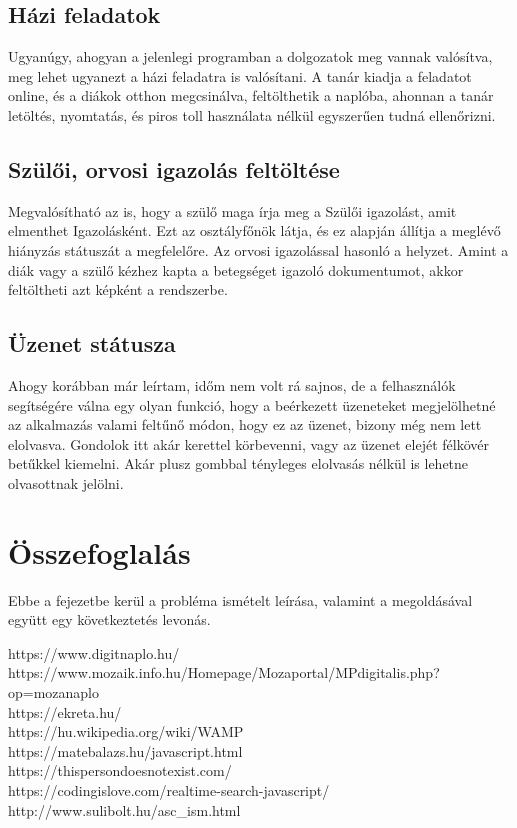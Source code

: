 \documentclass[
]{thesis-ekf}
\begin{document}
\section{Házi feladatok}
Ugyanúgy, ahogyan a jelenlegi programban a dolgozatok meg vannak valósítva, meg lehet ugyanezt a házi feladatra is valósítani. A  tanár kiadja a feladatot online, és a diákok otthon megcsinálva, feltölthetik a naplóba, ahonnan a tanár letöltés, nyomtatás, és piros toll használata nélkül egyszerűen tudná ellenőrizni. 
\section{Szülői, orvosi igazolás feltöltése}
Megvalósítható az is, hogy a szülő maga írja meg a Szülői igazolást, amit elmenthet Igazolásként. Ezt az osztályfőnök látja, és ez alapján állítja a meglévő hiányzás státuszát a megfelelőre. Az orvosi igazolással hasonló a helyzet. Amint a diák vagy a szülő kézhez kapta a betegséget igazoló dokumentumot, akkor feltöltheti azt képként a rendszerbe.
\section{Üzenet státusza}
Ahogy korábban már leírtam, időm nem volt rá sajnos, de a felhasználók segítségére válna egy olyan funkció, hogy a beérkezett üzeneteket megjelölhetné az alkalmazás valami feltűnő módon, hogy ez az üzenet, bizony még nem lett elolvasva. Gondolok itt akár kerettel körbevenni, vagy az üzenet elejét félkövér betűkkel kiemelni. Akár plusz gombbal tényleges elolvasás nélkül is lehetne olvasottnak jelölni.
\chapter{Összefoglalás}
Ebbe a fejezetbe kerül a probléma ismételt leírása, valamint a megoldásával együtt egy következtetés levonás.
\begin{thebibliography}{}
	https://www.digitnaplo.hu/\\
	https://www.mozaik.info.hu/Homepage/Mozaportal/MPdigitalis.php?op=mozanaplo\\
	https://ekreta.hu/\\
	https://hu.wikipedia.org/wiki/WAMP\\
	https://matebalazs.hu/javascript.html\\
	https://thispersondoesnotexist.com/ \\
	https://codingislove.com/realtime-search-javascript/\\
	http://www.sulibolt.hu/asc\_ism.html
\end{thebibliography}
\end{document}
